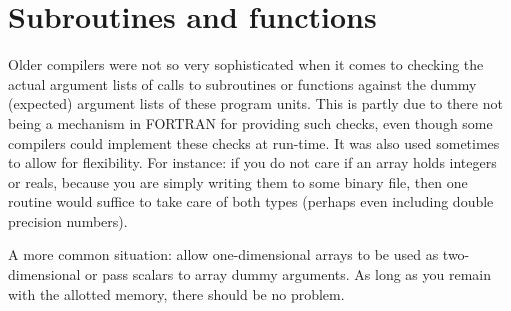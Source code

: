 \section{Subroutines and functions}
Older compilers were not so very sophisticated when it comes to checking the
actual argument lists of calls to subroutines or functions against the
dummy (expected) argument lists of these program units. This is partly due
to there not being a mechanism in FORTRAN for providing such checks, even though
some compilers could implement these checks at run-time. It was also used sometimes
to allow for flexibility. For instance: if you do not care if an array holds integers
or reals, because you are simply writing them to some binary file, then one
routine would suffice to take care of both types (perhaps even including double
precision numbers).

A more common situation: allow one-dimensional arrays to be used as two-dimensional
or pass scalars to array dummy arguments. As long as you remain with the allotted
memory, there should be no problem.

